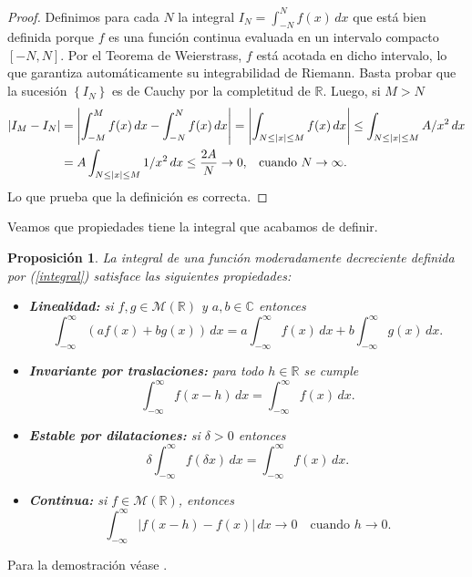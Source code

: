 \documentclass[12pt]{article}
\newcommand{\R}{\mathbb{R}}
\newcommand{\C}{\mathbb{C}}
\theoremstyle{plain}
\newtheorem{proposicion}[teorema]{Proposición}
\theoremstyle{definition}
\numberwithin{equation}{section}
\begin{document}
            \begin{proof}
                Definimos para cada \(N\) la integral \(I_N = \int_{-N}^{N} f(x)\,dx\) que está bien definida porque \(f\) es una función continua evaluada en un intervalo compacto $[-N, N]$. Por el Teorema de Weierstrass, $f$ está acotada en dicho intervalo, lo que garantiza automáticamente su integrabilidad de Riemann. Basta probar que la sucesión \(\left\{I_N\right\} \) es de Cauchy por la completitud de \(\R\). Luego, si \(M > N\)
                \begin{align*}
                    \left\lvert I_M - I_N \right\rvert &= \left\lvert \int_{-M}^{M} f(x)\,dx - \int_{-N}^{N} f(x)\,dx\right\rvert  = \left\lvert \int_{N \leq \left\lvert x\right\rvert \leq M} f(x)\,dx \right\rvert \leq \int_{N \leq \left\lvert x\right\rvert \leq M} A/x^2\,dx \\
                    &= A \int_{N \leq \left\lvert x\right\rvert \leq M} 1/x^2\,dx \leq \frac{2A}{N} \to 0, \hspace{3mm} \text{cuando \(N \to \infty\)}.
                \end{align*}
                Lo que prueba que la definición es correcta.
            \end{proof}
            Veamos que propiedades tiene la integral que acabamos de definir.
            \begin{proposicion}
                La integral de una función moderadamente decreciente definida por (\ref{integral}) satisface las siguientes propiedades: 
                \begin{itemize}
                    \item [(i)] \textbf{Linealidad:} si \(f,g \in \mathcal{M}(\R)\) y \(a,b \in \C\) entonces
                    $$ \int_{-\infty}^{\infty} (af(x) + bg(x)) \,dx = a \int_{-\infty}^{\infty} f(x) \,dx + b \int_{-\infty}^{\infty} g(x) \,dx .$$
                    \item [(ii)] \textbf{Invariante por traslaciones:} para todo \(h \in \R\) se cumple
                    $$ \int_{-\infty}^{\infty} f(x - h) \,dx = \int_{-\infty}^{\infty} f(x) \,dx .$$
                    \item [(iii)] \textbf{Estable por dilataciones:} si \(\delta > 0\) entonces
                    $$ \delta \int_{-\infty}^{\infty} f(\delta x) \,dx = \int_{-\infty}^{\infty} f(x) \,dx .$$
                    \item [(iv)] \textbf{Continua:} si \(f \in \mathcal{M}(\R)\), entonces
                    $$ \int_{-\infty}^{\infty} \left\lvert f(x - h) - f(x) \right\rvert \,dx \to 0 \quad \text{cuando } h \to 0 .$$
                \end{itemize}
            \end{proposicion}
            Para la demostración véase \cite[Chapter 5. Proposición 1.1]{stein_fourier}.
\end{document}
